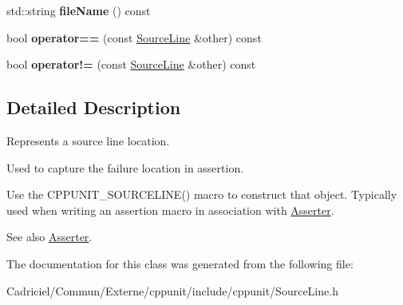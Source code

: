 \begin{DoxyCompactItemize}
\item 
std\+::string {\bfseries file\+Name} () const \hypertarget{class_source_line_a1571a51d45ebcea382b86224ef767a2e}{}\label{class_source_line_a1571a51d45ebcea382b86224ef767a2e}

\item 
bool {\bfseries operator==} (const \hyperlink{class_source_line}{Source\+Line} \&other) const \hypertarget{class_source_line_a6c9eff68161f364725b3a51fc60c3e01}{}\label{class_source_line_a6c9eff68161f364725b3a51fc60c3e01}

\item 
bool {\bfseries operator!=} (const \hyperlink{class_source_line}{Source\+Line} \&other) const \hypertarget{class_source_line_aa4633f46f9c9f470c6b680327d002e86}{}\label{class_source_line_aa4633f46f9c9f470c6b680327d002e86}

\end{DoxyCompactItemize}


\subsection{Detailed Description}
Represents a source line location.

Used to capture the failure location in assertion. 

Use the C\+P\+P\+U\+N\+I\+T\+\_\+\+S\+O\+U\+R\+C\+E\+L\+I\+N\+E() macro to construct that object. Typically used when writing an assertion macro in association with \hyperlink{struct_asserter}{Asserter}.

\begin{DoxySeeAlso}{See also}
\hyperlink{struct_asserter}{Asserter}. 
\end{DoxySeeAlso}


The documentation for this class was generated from the following file\+:\begin{DoxyCompactItemize}
\item 
Cadriciel/\+Commun/\+Externe/cppunit/include/cppunit/Source\+Line.\+h\end{DoxyCompactItemize}
